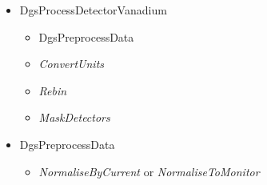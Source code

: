 \begin{itemize}
\item DgsProcessDetectorVanadium
\begin{itemize}
\item DgsPreprocessData
\item \textit{ConvertUnits}
\item \textit{Rebin}
\item \textit{MaskDetectors}
\end{itemize}
\end{itemize}

\begin{itemize}
\item DgsPreprocessData
\begin{itemize}
\item \textit{NormaliseByCurrent} or \textit{NormaliseToMonitor}
\end{itemize}
\end{itemize}

